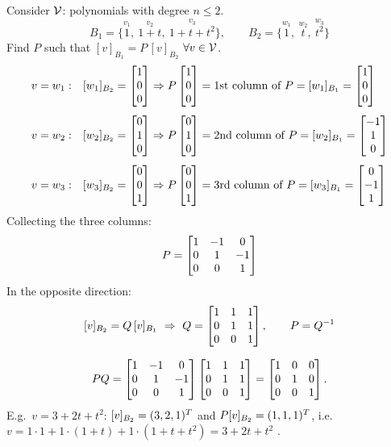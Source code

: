 \begin{example}
Consider $\mathcal{V}$: polynomials with degree $n\le2$.
\[
B_1 = \{\overset{v_1}{1},\ \overset{v_2}{1+t},\ \overset{v_3}{1+t+t^2}\},
\qquad
B_2 = \{\overset{w_1}{1},\ \overset{w_2}{t},\ \overset{w_3}{t^2}\}
\]
Find $P$ such that $[v]_{B_1} = P\,[v]_{B_2}$ $\forall v\in\mathcal{V}$.
\begin{align*}
v=w_1:&\quad [w_1]_{B_2} = \begin{bmatrix}1\\0\\0\end{bmatrix} \Rightarrow P\begin{bmatrix}1\\0\\0\end{bmatrix} = \text{1st column of } P = [w_1]_{B_1} = \begin{bmatrix}1\\0\\0\end{bmatrix}\\[4pt]
v=w_2:&\quad [w_2]_{B_2} = \begin{bmatrix}0\\1\\0\end{bmatrix} \Rightarrow P\begin{bmatrix}0\\1\\0\end{bmatrix} = \text{2nd column of } P = [w_2]_{B_1} = \begin{bmatrix}-1\\1\\0\end{bmatrix}\\[4pt]
v=w_3:&\quad [w_3]_{B_2} = \begin{bmatrix}0\\0\\1\end{bmatrix} \Rightarrow P\begin{bmatrix}0\\0\\1\end{bmatrix} = \text{3rd column of } P = [w_3]_{B_1} = \begin{bmatrix}0\\-1\\1\end{bmatrix}
\end{align*}
 Collecting the three columns:
\[
P = \begin{bmatrix}1&-1&0\\0&1&-1\\0&0&1\end{bmatrix}
\]
In the opposite direction:
\[
[v]_{B_2} = Q\,[v]_{B_1} \ \Rightarrow\ Q = \begin{bmatrix}1&1&1\\0&1&1\\0&0&1\end{bmatrix}, \qquad P = Q^{-1}
\]
\begin{insight}[Check]
\[
PQ=\begin{bmatrix}1&-1&0\\0&1&-1\\0&0&1\end{bmatrix}\begin{bmatrix}1&1&1\\0&1&1\\0&0&1\end{bmatrix}=\begin{bmatrix}1&0&0\\0&1&0\\0&0&1\end{bmatrix}.
\]
E.g.\ $v=3+2t+t^2$: $[v]_{B_2}=(3,2,1)^{T}$ and $P[v]_{B_2}=(1,1,1)^{T}$, i.e.\ $v=1\cdot1+1\cdot(1+t)+1\cdot(1+t+t^2)=3+2t+t^2$ \checkmark.
\end{insight}
\end{example}
